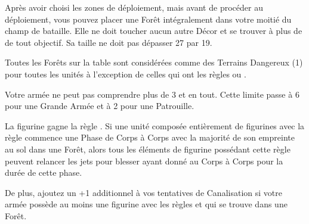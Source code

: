 \newcommand{\hawthornpointrule}{%
\feyarrows{}. \poisonedattacks{}.
}

\newcommand{\poisonedthornrule}{%
Arme de Tir. \range{12}, Force 3, \poisonedattacks{}, \armourpiercing{1}, \quicktofire{}.
}















\startarmywiderules

\armyspecialruleentry{\theforestfollows}

Après avoir choisi les zones de déploiement, mais avant de procéder au déploiement, vous pouvez placer une Forêt intégralement dans votre moitié du champ de bataille. Elle ne doit toucher aucun autre Décor et se trouver à plus de  de tout objectif. Sa taille ne doit pas dépasser \unit{27}{\centi\meter} par \unit{19}{\centi\meter}.

Toutes les Forêts sur la table sont considérées comme des Terrains Dangereux (1) pour toutes les unités à l'exception de celles qui ont les règles \strider{} ou \strider{\forest}. 

\armyspecialruleentry{\therarestofspirits}

Votre armée ne peut pas comprendre plus de 3 \treefathers{} et \treefatherancients{} en tout. Cette limite passe à 6 pour une Grande Armée et à 2 pour une Patrouille.

\closearmywiderules






\vspace*{1.5cm}
\startarmyspecialrules

\armyspecialruleentry{\forestwalker}

La figurine gagne la règle \strider{\forest}. Si une unité composée entièrement de figurines avec la règle \forestwalker{} commence une Phase de Corps à Corps avec la majorité de son empreinte au sol dans une Forêt, alors tous les éléments de figurine possédant cette règle peuvent relancer les jets pour blesser ayant donné  au Corps à Corps pour la durée de cette phase.

De plus, ajoutez un +1 additionnel à vos tentatives de Canalisation si votre armée possède au moins une figurine avec les règles \channel{} et \forestwalker{} qui se trouve dans une Forêt. 

